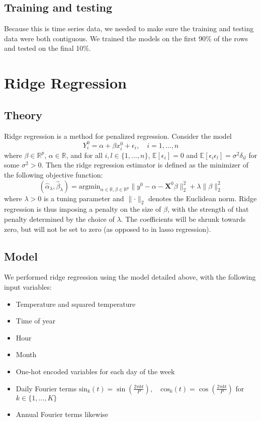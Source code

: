 \documentclass[
]{article}
\providecommand{\tightlist}{%
  \setlength{\itemsep}{0pt}\setlength{\parskip}{0pt}}
\begin{document}
\hypertarget{training-and-testing}{%
\subsection{Training and testing}\label{training-and-testing}}

Because this is time series data, we needed to make sure the training
and testing data were both contiguous. We trained the models on the
first 90\% of the rows and tested on the final 10\%.

\hypertarget{ridge-regression}{%
\section{Ridge Regression}\label{ridge-regression}}

\hypertarget{theory}{%
\subsection{Theory}\label{theory}}

Ridge regression is a method for penalized regression. Consider the
model \[Y_i^0 = \alpha + \beta x_i^0 + \epsilon_i, \quad  i = 1,..., n\]
where \(\beta \in \mathbb{R}^p\), \(\alpha \in \mathbb{R}\), and for all
\(i, l \in \{1, ..., n\}\), \(\mathbb{E}[\epsilon_i] = 0\) and
\(\mathbb{E}[\epsilon_i \epsilon_l] = \sigma^2 \delta_{il}\) for some
\(\sigma^2 > 0\). Then the ridge regression estimator is defined as the
minimizer of the following objective function:
\[(\hat{\alpha}_\lambda, \hat{\beta}_\lambda) = \mathrm{argmin}_{\alpha \in \mathbb{R}, \beta \in \mathbb{R}^p} \lVert y^0 - \alpha - \boldsymbol{X}^0 \beta \rVert^2_2 + \lambda \lVert \beta \rVert^2_2\]
where \(\lambda > 0\) is a tuning parameter and
\(\lVert \cdot \rVert_2\) denotes the Euclidean norm. Ridge regression
is thus imposing a penalty on the size of \(\beta\), with the strength
of that penalty determined by the choice of \(\lambda\). The
coefficients will be shrunk towards zero, but will not be set to zero
(as opposed to in lasso regression).

\hypertarget{model}{%
\subsection{Model}\label{model}}

We performed ridge regression using the model detailed above, with the
following input variables:

\begin{itemize}
\tightlist
\item
  Temperature and squared temperature
\item
  Time of year
\item
  Hour
\item
  Month
\item
  One-hot encoded variables for each day of the week
\item
  Daily Fourier terms
  \(\text{sin}_k(t) = \sin\left(\frac{2\pi kt}{P}\right), \quad \text{cos}_k(t) = \cos\left(\frac{2\pi kt}{P}\right)\)
  for \(k \in \{1,...,K\}\)
\item
  Annual Fourier terms likewise
\end{itemize}
\end{document}
